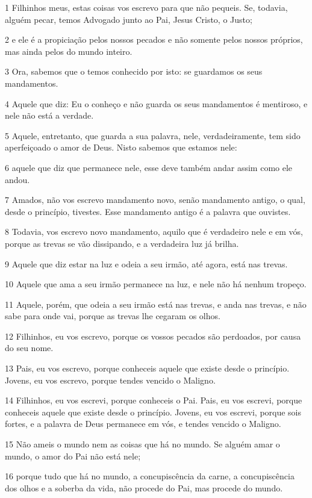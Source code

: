 \par 1 Filhinhos meus, estas coisas vos escrevo para que não pequeis. Se, todavia, alguém pecar, temos Advogado junto ao Pai, Jesus Cristo, o Justo;
\par 2 e ele é a propiciação pelos nossos pecados e não somente pelos nossos próprios, mas ainda pelos do mundo inteiro.
\par 3 Ora, sabemos que o temos conhecido por isto: se guardamos os seus mandamentos.
\par 4 Aquele que diz: Eu o conheço e não guarda os seus mandamentos é mentiroso, e nele não está a verdade.
\par 5 Aquele, entretanto, que guarda a sua palavra, nele, verdadeiramente, tem sido aperfeiçoado o amor de Deus. Nisto sabemos que estamos nele:
\par 6 aquele que diz que permanece nele, esse deve também andar assim como ele andou.
\par 7 Amados, não vos escrevo mandamento novo, senão mandamento antigo, o qual, desde o princípio, tivestes. Esse mandamento antigo é a palavra que ouvistes.
\par 8 Todavia, vos escrevo novo mandamento, aquilo que é verdadeiro nele e em vós, porque as trevas se vão dissipando, e a verdadeira luz já brilha.
\par 9 Aquele que diz estar na luz e odeia a seu irmão, até agora, está nas trevas.
\par 10 Aquele que ama a seu irmão permanece na luz, e nele não há nenhum tropeço.
\par 11 Aquele, porém, que odeia a seu irmão está nas trevas, e anda nas trevas, e não sabe para onde vai, porque as trevas lhe cegaram os olhos.
\par 12 Filhinhos, eu vos escrevo, porque os vossos pecados são perdoados, por causa do seu nome.
\par 13 Pais, eu vos escrevo, porque conheceis aquele que existe desde o princípio. Jovens, eu vos escrevo, porque tendes vencido o Maligno.
\par 14 Filhinhos, eu vos escrevi, porque conheceis o Pai. Pais, eu vos escrevi, porque conheceis aquele que existe desde o princípio. Jovens, eu vos escrevi, porque sois fortes, e a palavra de Deus permanece em vós, e tendes vencido o Maligno.
\par 15 Não ameis o mundo nem as coisas que há no mundo. Se alguém amar o mundo, o amor do Pai não está nele;
\par 16 porque tudo que há no mundo, a concupiscência da carne, a concupiscência dos olhos e a soberba da vida, não procede do Pai, mas procede do mundo.
